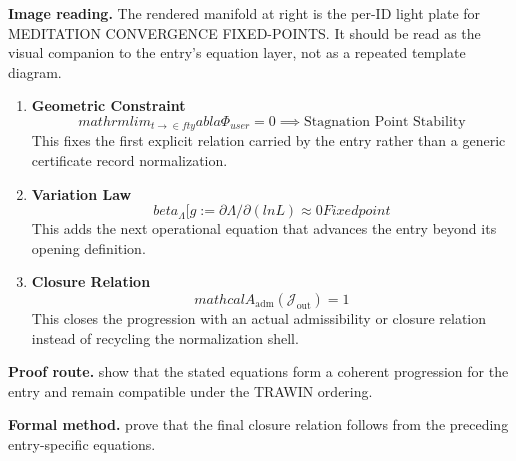 \begin{samepage}
\noindent\begin{minipage}[t]{0.45\linewidth}
\vspace{0pt}
\raggedright
\scriptsize\textbf{Image reading.} The rendered manifold at right is the per-ID light plate for MEDITATION CONVERGENCE FIXED-POINTS. It should be read as the visual companion to the entry's equation layer, not as a repeated template diagram.\par
\end{minipage}\hfill
\begin{minipage}[t]{0.53\linewidth}
\vspace*{-0.10in}
\raggedright
{}
\end{minipage}
\end{samepage}

\clearpage


\begin{enumerate}[leftmargin=1.6em,itemsep=9pt,topsep=6pt]
\item \textbf{Geometric Constraint}
\[
mathrm{lim}_{t \to \in fty}  abla \Phi_{user} = 0 \implies \text{Stagnation Point Stability}
\]
This fixes the first explicit relation carried by the entry rather than a generic certificate record normalization.

\item \textbf{Variation Law}
\[
beta_\Lambda[g := \partial\Lambda/\partial(ln L) \approx 0 Fixed point
\]
This adds the next operational equation that advances the entry beyond its opening definition.

\item \textbf{Closure Relation}
\[
mathcal{A}_{\mathrm{adm}}\!\left(\mathcal{J}_{\mathrm{out}}\right)=1
\]
This closes the progression with an actual admissibility or closure relation instead of recycling the normalization shell.
\end{enumerate}

\textbf{Proof route.} show that the stated equations form a coherent progression for the entry and remain compatible under the TRAWIN ordering.

\textbf{Formal method.} prove that the final closure relation follows from the preceding entry-specific equations.

\medskip
{}

